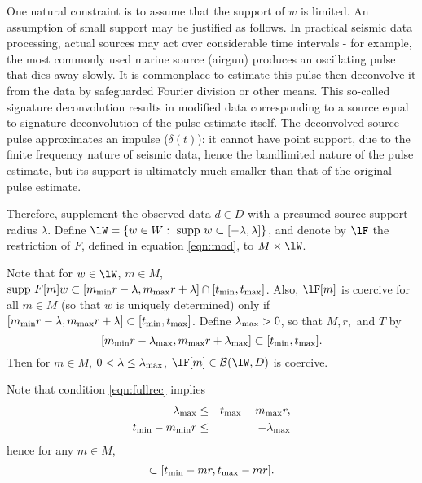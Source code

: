 One natural constraint is to assume that the support of $w$ is
limited. An assumption of small support may be justified as
follows. In practical seismic data processing, actual sources may act
over considerable time intervals - for example, the most commonly used
marine source (airgun) produces an oscillating pulse that dies away
slowly. It is commonplace to estimate this pulse then deconvolve it
from the data by safeguarded Fourier division or other means. This
so-called signature deconvolution results in modified data
corresponding to a source equal to signature deconvolution of the
pulse estimate itself. The deconvolved source pulse approximates an
impulse ($\delta(t)$): it cannot have point support, due to the finite
frequency nature of seismic data, hence the bandlimited nature of the
pulse estimate, but its support is ultimately much smaller than that
of the original pulse estimate.

Therefore, supplement the observed data $d \in D$ with a presumed 
source support radius $\lambda$. Define 
$\lW=\{w \in W: \mbox{ supp }w \subset [-\lambda,\lambda]\}$, and 
denote by $\lF$ the restriction of $F$, defined in equation 
\ref{eqn:mod}, to $M \times \lW$.

Note that for $w \in \lW$, $m \in M$,
$\mbox{supp }F[m]w \subset [ m_{\rm min}r-\lambda,
m_{\rm max}r+\lambda] \cap
[t_{\rm min},t_{\rm max}]$. Also, $\lF[m]$ is coercive for all $m \in
M$ (so that $w$ is uniquely determined) only if
$[ m_{\rm min}r-\lambda,m_{\rm max}r+\lambda] \subset
[t_{\rm min},t_{\rm max}]$. Define $\lambda_{\rm max}
>0$, so that $M, r,$ and $T$ by
\begin{equation}
  \label{eqn:fullrec}
  [ m_{\rm min}r-\lambda_{\rm max}, m_{\rm max}r+\lambda_{\rm max}]
  \subset [t_{\rm min},t_{\rm max}].
\end{equation}
Then for 
$m \in M$, $0 <\lambda \le \lambda_{\rm max}$, $\lF[m] \in {\cal B}(\lW,D)$ is coercive.

Note that condition \ref{eqn:fullrec} implies
\begin{eqnarray}
  \lambda_{\rm max} & \le & t_{\rm max}-m_{\rm max}r,\nonumber \\
  t_{\rm min}-m_{\rm min}r & \le & -\lambda_{\rm max} \label{eqn:lminc}
\end{eqnarray}
hence for any $m \in M$,
\begin{equation}
  [-\lambda_{\rm max}, -\lambda_{\rm max}] \subset[ t_{\rm min}-mr ,
  t_{\rm max}-mr].
  \label{eqn:zeroinc}
\end{equation}

